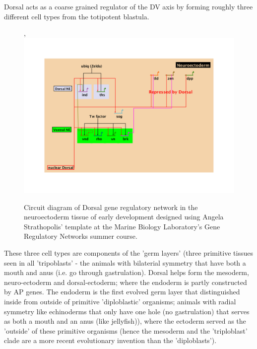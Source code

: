   Dorsal acts as a coarse grained regulator of the DV axis by forming roughly three different cell types from the totipotent blastula.
  
\begin{figure},
  \includegraphics[width=1\textwidth]{slide2jacob}\\
  \caption{Circuit diagram of Dorsal gene regulatory network in the neuroectoderm tissue of early development designed using Angela Strathopolis' template at the Marine Biology Laboratory's Gene Regulatory Networks summer course.}\label{shift2}
\end{figure}
  
  
    These three cell types are components of the 'germ layers' (three primitive tissues seen in all 'tripoblasts' - the animals with bilaterial symmetry that have both a mouth and anus (i.e. go through gastrulation).  Dorsal helps form the mesoderm, neuro-ectoderm and dorsal-ectoderm; where the endoderm is partly constructed by AP genes.  The endoderm is the first evolved germ layer that distinguished inside from outside of primitive 'diploblastic' organisms; animals with radial symmetry like echinoderms that only have one hole (no gastrulation) that serves as both a mouth and an anus (like jellyfish)), where the ectoderm served as the 'outside' of these primitive organisms (hence the mesoderm and the 'triploblast' clade are a more recent evolutionary invention than the 'diploblasts'). 


